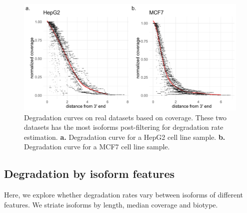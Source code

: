 \begin{figure}[H]
    \centering
    \includegraphics[width=\textwidth]{figures/sec-2-cov-real.png}
    \caption[Degradation curves on real datasets based on coverage]{Degradation curves on real datasets based on coverage. These two datasets has the most isoforms post-filtering for degradation rate estimation. \textbf{a.} Degradation curve for a HepG2 cell line sample. \textbf{b.} Degradation curve for a MCF7 cell line sample.}
    \label{fig:cov-real}
\end{figure}

\subsection{Degradation by isoform features}

Here, we explore whether degradation rates vary between isoforms of different features. We striate isoforms by length, median coverage and biotype. 

